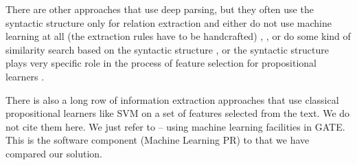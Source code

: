 \documentclass[runningheads,a4paper]{llncs}
\begin{document}


There are other approaches that use deep parsing, but they often use the syntactic structure only for relation extraction and either do not use machine learning at all (the extraction rules have to be handcrafted) 
\cite{Yakushiji2001},
\cite{RelEx},
\cite{Buyko:dependencyGraphs}
or do some kind of similarity search based on the syntactic structure
\cite{Etzioni08informationExtraction},
\cite{Wang:SimilarityTreeSkeletons}
or the syntactic structure plays very specific role in the process of feature selection for propositional learners %
\cite{Bunescu:DependencyPaths}.

There is also a long row of information extraction approaches that use classical propositional learners like SVM on a set of features selected from the text. We do not cite them here. We just refer to \cite{Yaoyong09a} -- using machine learning facilities in GATE. This is the software component (Machine Learning PR) to that we have compared our solution.
\end{document}
